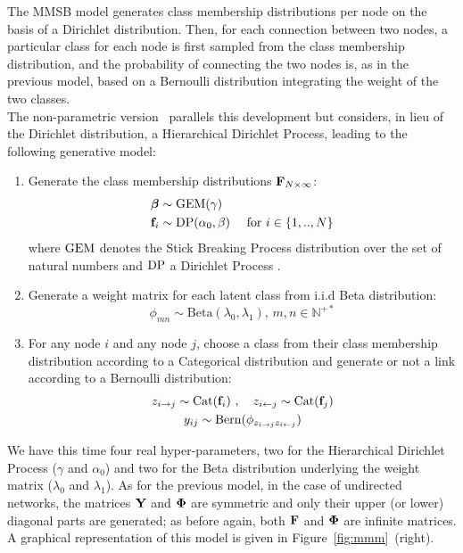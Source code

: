 The MMSB model generates class membership distributions per node on the basis of a Dirichlet distribution. Then, for each connection between two nodes, a particular class for each node is first sampled from the class membership distribution, and the probability of connecting the two nodes is, as in the previous model, based on a Bernoulli distribution integrating the weight of the two classes. 
~\\
The non-parametric version \imb\ parallels this development but considers, in lieu of the Dirichlet distribution, a Hierarchical Dirichlet Process, leading to the following generative model:
%
\begin{enumerate}
\item Generate the class membership distributions $\mathbf{F}_{N \times \infty}$:
   \begin{align}
       \bm{\beta} &\sim \mathrm{GEM}(\gamma) \nonumber \\
    \mathbf{f}_i &\sim \mathrm{DP}(\alpha_0, \beta) \quad\textnormal{ for }  i \in \{1, .., N\} \nonumber
   \end{align}
where $\mathrm{GEM}$ denotes the Stick Breaking Process distribution over the set of natural numbers and $\mathrm{DP}$ a Dirichlet Process  \cite{HDP}.
\item Generate a weight matrix for each latent class from i.i.d Beta distribution:\\
\[ \phi_{mn} \sim \mathrm{Beta}(\lambda_0,\lambda_1), \, m,n \in \mathbb{N}^{+*} \]
\item For any node $i$ and any node $j$, choose a class from their class membership distribution according to a Categorical distribution and generate or not a link according to a Bernoulli distribution:
   \begin{gather*}
    z_{i \rightarrow j} \sim \mbox{Cat}(\mathbf{f}_i) \ , \quad z_{i \leftarrow j} \sim \mbox{Cat}(\mathbf{f}_j) \\
    y_{ij} \sim \mathrm{Bern}(\phi_{z_{i \rightarrow j}z_{i \leftarrow j}})
   \end{gather*}
\end{enumerate}
%
We have this time four real hyper-parameters, two for the Hierarchical Dirichlet Process ($\gamma$ and $\alpha_0$) and two for the Beta distribution underlying the weight matrix ($\lambda_0$ and $\lambda_1$). As for the previous model, in the case of undirected networks, the matrices $\mathbf{Y}$ and $\mathbf{\Phi}$ are symmetric and only their upper (or lower) diagonal parts are generated; as before again, both $\mathbf{F}$ and $\mathbf{\Phi}$ are infinite matrices. A graphical representation of this model is given in Figure~\ref{fig:mmm}~(right).


